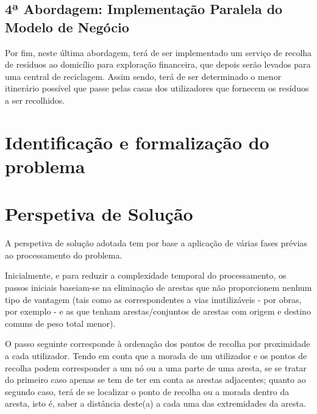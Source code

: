\documentclass[article, a4paper, 12pt, oneside]{memoir}
\begin{document}
\section[4ª Abordagem: Implementação Paralela do Modelo de Negócio][4ª Abordagem: Implementação Paralela do Modelo de Negócio]{4ª Abordagem: Implementação Paralela do Modelo de Negócio} \label{\thesection}
	
	Por fim, neste última abordagem, terá de ser implementado um serviço de recolha de resíduos ao domicílio para exploração financeira, que depois serão levados para uma central de reciclagem. Assim sendo, terá de ser determinado o menor itinerário possível que passe pelas casas dos utilizadores que fornecem os resíduos a ser recolhidos.



\newpage
\chapter[Identificação e formalização do problema][Identificação e formalização do problema]{Identificação e formalização do problema} \label{\thechapter}



\newpage
\chapter[Perspetiva de Solução][Perspetiva de Solução]{Perspetiva de Solução} \label{\thechapter}
A perspetiva de solução adotada tem por base a aplicação de várias fases prévias ao processamento do problema.

Inicialmente, e para reduzir a complexidade temporal do processamento, os passos iniciais baseiam-se na eliminação de arestas que não proporcionem nenhum tipo de vantagem (tais como as correspondentes a vias inutilizáveis - por obras, por exemplo - e as que tenham arestas/conjuntos de arestas com origem e destino comuns de peso total menor).

O passo seguinte corresponde à ordenação dos pontos de recolha por proximidade a cada utilizador. Tendo em conta que a morada de um utilizador e os pontos de recolha podem corresponder a um nó ou a uma parte de uma aresta, se se tratar do primeiro caso apenas se tem de ter em conta as arestas adjacentes; quanto ao segundo caso, terá de se localizar o ponto de recolha ou a morada dentro da aresta, isto é, saber a distância deste(a) a cada uma das extremidades da aresta.\\\
\end{document}
